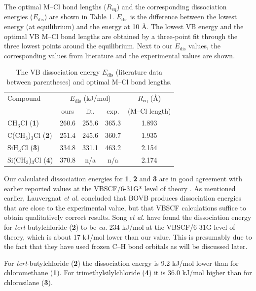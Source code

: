 The optimal M--Cl bond lengths ($R_\mathrm{eq}$) and the corresponding dissociation energies ($E_\mathrm{dis}$) are shown in Table \ref{ch3.tab.optimal}. $E_\mathrm{dis}$ is the difference between the lowest energy (at equilibrium) and the energy at 10 \AA. The lowest VB energy and the optimal VB M--Cl bond lengths are obtained by a three-point fit through the three lowest points around the equilibrium. Next to our $E_\mathrm{dis}$ values, the corresponding values from literature and the experimental values \cite{lauvergnat,psu} are shown. 
\begin{table}[htp]
\center
\caption{The VB dissociation energy $E_\mathrm{dis}$ (literature data \cite{lauvergnat,psu} between parentheses) and optimal M--Cl bond lengths.}
\begin{tabular}{|l|c|c|c|c|} 
\hline
Compound & \multicolumn{3}{c|}{$E_\mathrm{dis}$ (kJ/mol)} & $R_\mathrm{eq}$ (\AA)\\
&\multicolumn{1}{c}{ours} & \multicolumn{1}{c}{lit.} & \multicolumn{1}{c|}{exp.} & (M--Cl length) \\ 
\hline
CH$_3$Cl (\textbf{1})& 260.6 & 255.6 & 365.3 & 1.893 \\
C(CH$_3$)$_3$Cl (\textbf{2}) & 251.4 & 245.6 & 360.7 & 1.935 \\
SiH$_3$Cl (\textbf{3})& 334.8 & 331.1 & 463.2 & 2.154 \\
Si(CH$_3$)$_3$Cl (\textbf{4}) & 370.8 & n/a & n/a & 2.174 \\
\hline
\end{tabular}
\label{ch3.tab.optimal}
\end{table}
Our calculated dissociation energies for \textbf{1}, \textbf{2} and \textbf{3} are in good agreement with earlier reported values at the VBSCF/6-31G* level of theory \cite{lauvergnat, psu}. As mentioned earlier, Lauvergnat \textit{et al.} \cite{lauvergnat} concluded that BOVB produces dissociation energies that are close to the experimental value, but that VBSCF calculations suffice to obtain qualitatively correct results. Song \textit{et al.} \cite{song} have found the dissociation energy for \textit{tert}-butylchloride (\textbf{2}) to be \textit{ca.} 234 kJ/mol at the VBSCF/6-31G level of theory, which is about 17 kJ/mol lower than our value. This is presumably due to the fact that they have used frozen C--H bond orbitals as will be discussed later.

For \textit{tert}-butylchloride (\textbf{2}) the dissociation energy is 9.2 kJ/mol lower than for chloromethane (\textbf{1}). For trimethylsilylchloride (\textbf{4}) it is 36.0 kJ/mol higher than for chlorosilane (\textbf{3}).

